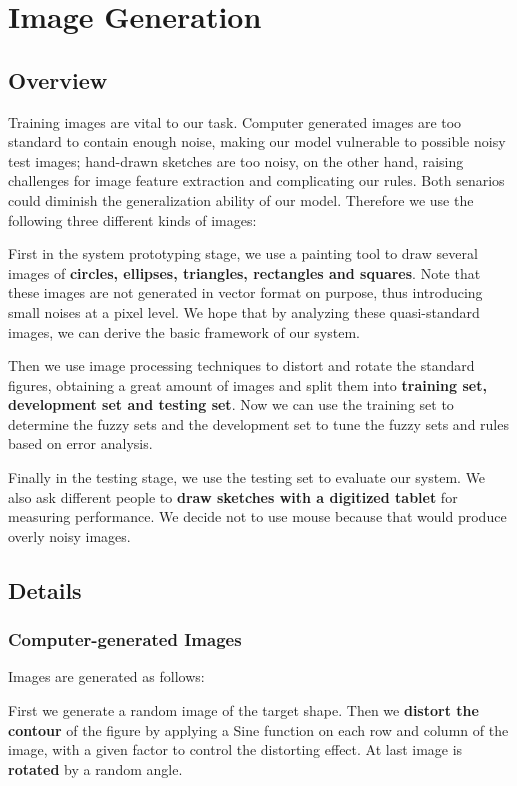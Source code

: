 \section{Image Generation}

\subsection{Overview}

Training images are vital to our task. Computer generated images are too standard to contain enough noise, making our model vulnerable to possible noisy test images; hand-drawn sketches are too noisy, on the other hand, raising challenges for image feature extraction and complicating our rules. Both senarios could diminish the generalization ability of our model. Therefore we use the following three different kinds of images:

First in the system prototyping stage, we use a painting tool to draw several images of \textbf{circles, ellipses, triangles, rectangles and squares}. Note that these images are not generated in vector format on purpose, thus introducing small noises at a pixel level. We hope that by analyzing these quasi-standard images, we can derive the basic framework of our system.

Then we use image processing techniques to distort and rotate the standard figures, obtaining a great amount of images and split them into \textbf{training set, development set and testing set}. Now we can use the training set to determine the fuzzy sets and the development set to tune the fuzzy sets and rules based on error analysis.

Finally in the testing stage, we use the testing set to evaluate our system. We also ask different people to \textbf{draw sketches with a digitized tablet} for measuring performance. We decide not to use mouse because that would produce overly noisy images.

\subsection{Details}

\subsubsection{Computer-generated Images}

Images are generated as follows:

First we generate a random image of the target shape. Then we \textbf{distort the contour} of the figure by applying a Sine function on each row and column of the image, with a given factor to control the distorting effect. At last image is \textbf{rotated} by a random angle.


